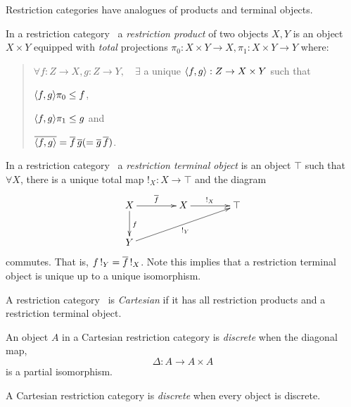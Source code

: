     Restriction categories have analogues of products and terminal objects.

    \begin{definition}
      In a restriction category \X\, a \emph{restriction product}  of two objects $X, Y$ is an 
      object $X\times Y$ equipped with \emph{total} projections 
      $\pi_0:X\times Y\to X, \pi_1:X\times Y\to Y $ where:
      \begin{quote}
        $\forall f:Z\to X, g: Z\to Y,\quad \exists$ a unique $\langle f,g\rangle:Z \to X\times Y$ such that
        \bi
          \item $\langle f,g\rangle \pi_0 \le f$,
          \item $\langle f,g\rangle \pi_1 \le g$ and
          \item $\overline{\langle f,g\rangle} = \overline{f}\, \overline{g} ( = \overline{g}\, \overline{f})$.
        \ei
      \end{quote}
    \end{definition}

    \begin{definition}
      In a restriction category \X\, a \emph{restriction terminal object}
      is an object $\top$ such that $\forall X$, there is a
      unique total map $!_X : X \to \top$ and the diagram
      \[
        \xymatrix @C=40pt @R=25pt{
          X \ar[r]^{\restr{f}} \ar[d]^{f} & X \ar[r]^{!_X}  &\top  \\
          Y \ar[urr]_{!_Y}
        }
      \]
      commutes. That is,  $f\, !_Y = \overline{f}\, !_X$. Note this implies
      that a restriction terminal object is unique up to a unique isomorphism.
    \end{definition}

    \begin{definition}
      A restriction category \X\ is \emph{Cartesian} if it has all restriction products
      and a restriction terminal object.
    \end{definition}

    \begin{definition}
      An object $A$ in a Cartesian restriction category is \emph{discrete}
      when the diagonal map,
      \[
        \Delta:A \to A \times A
      \]
      is a partial isomorphism.

      A Cartesian restriction category is \emph{discrete} when every object is discrete.
    \end{definition}

